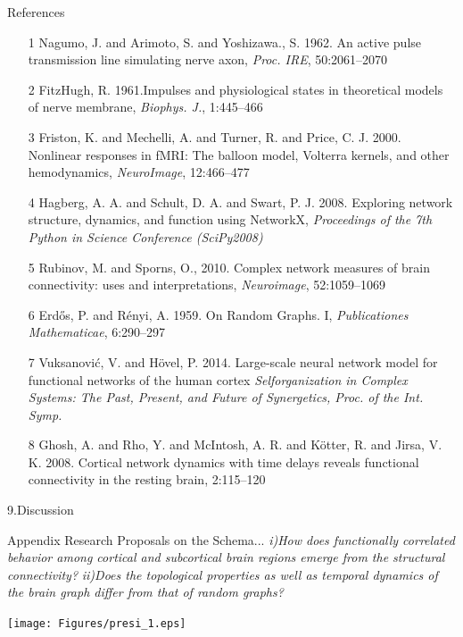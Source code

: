 \documentclass{beamer}
\begin{document}
\begin{frame}{References}
\begin{itemize}\footnotesize
\item[1] Nagumo, J.  and Arimoto, S.  and Yoshizawa., S. 1962. An active pulse transmission line simulating nerve axon, \textit{ Proc. IRE}, 50:2061--2070
\item[2] FitzHugh, R. 1961.Impulses and physiological states in theoretical models of nerve membrane, \textit{Biophys. J.}, 1:445--466
\item[3] Friston, K.  and Mechelli, A. and Turner, R. and Price, C. J. 2000. Nonlinear responses in fMRI: The balloon model, Volterra kernels, and other hemodynamics, \textit{NeuroImage},  12:466--477
\item[4] Hagberg, A. A. and Schult, D. A. and Swart, P. J. 2008. Exploring network structure, dynamics, and function using NetworkX, \textit{Proceedings of the 7th Python in Science Conference (SciPy2008)}
\item[5] Rubinov, M. and Sporns, O., 2010. Complex network measures of brain connectivity: uses and interpretations, \textit{Neuroimage}, 52:1059--1069
\item[6] Erd\H{o}s, P. and R\'{e}nyi, A. 1959. On Random Graphs. I, \textit{Publicationes Mathematicae}, 6:290–297
\item[7] Vuksanovi\'{c}, V.  and H{\"o}vel, P. 2014. Large-scale neural network model for functional networks of the human cortex \textit{Selforganization in Complex Systems: The Past, Present, and Future of Synergetics, Proc. of the Int. Symp.} 
\item[8] Ghosh, A.  and Rho, Y. and McIntosh, A. R. and K{\"o}tter, R. and Jirsa, V. K. 2008. Cortical network dynamics with time delays reveals functional connectivity in the resting brain, 2:115--120

\end{itemize}


\end{frame}


\begin{frame}{9.Discussion}

\end{frame}


\begin{frame}{Appendix}
Research Proposals on the Schema...
\footnotesize{\textit{i)How does functionally correlated behavior among cortical and subcortical brain regions emerge from the structural connectivity? }} 
\break
\break
\footnotesize{\textit{ii)Does the topological properties as well as temporal dynamics of the brain graph differ from that of random graphs? }}

\centering
\texttt{[image: Figures/presi\_1.eps]} 

\end{frame}
\end{document}
